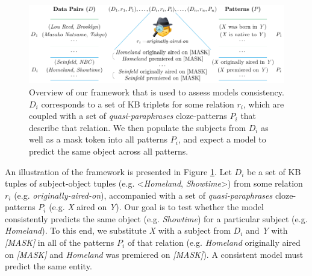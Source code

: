 \begin{figure}[t!]
\centering

\includegraphics[width=1.\columnwidth]{figures/framework}

\caption{Overview of our framework that is used to assess models consistency. $D_i$ corresponds to a set of KB triplets for some relation $r_i$, which are coupled with a set of \textit{quasi-paraphrases} cloze-patterns $P_i$ that describe that relation. We then populate the subjects from $D_i$ as well as a mask token into all patterns $P_i$, and expect a model to predict the same object across all patterns.}
\label{fig:framework}
\end{figure}




An illustration of the framework is presented in Figure \ref{fig:framework}.
Let $D_i$ be a set of KB tuples of subject-object tuples (e.g. <\textit{Homeland}, \textit{Showtime}>) from some relation $r_i$ (e.g. \textit{originally-aired-on}), accompanied with a set of \textit{quasi-paraphrases} cloze-patterns $P_i$ (e.g. \textit{X} aired on \textit{Y}).
Our goal is to test whether the model consistently predicts the same object (e.g. \textit{Showtime}) for a particular subject (e.g. \textit{Homeland}). To this end, we substitute \textit{X} with a subject from $D_i$ and \textit{Y} with \textit{[MASK]} in all of the patterns $P_i$ of that relation (e.g. \textit{Homeland} originally aired on \textit{[MASK]} and \textit{Homeland} was premiered on \textit{[MASK]}).
A consistent model must predict the same entity. 


